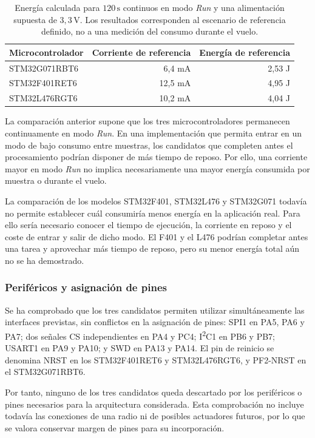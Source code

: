 \documentclass[11pt,a4paper]{article}
\begin{document}
\begin{table}[H]
    \centering
    \begin{tabular}{lrr}
        \toprule
        Microcontrolador & Corriente de referencia & Energía de referencia \\
        \midrule
        STM32G071RBT6 & 6,4 mA  & 2,53 J \\
        STM32F401RET6 & 12,5 mA & 4,95 J \\
        STM32L476RGT6 & 10,2 mA & 4,04 J \\
        \bottomrule
    \end{tabular}
    \caption{Energía calculada para \(120\,\mathrm{s}\) continuos en
    modo \textit{Run} y una alimentación supuesta de \(3{,}3\,\mathrm{V}\).
    Los resultados corresponden al escenario de referencia definido,
    no a una medición del consumo durante el vuelo.}%
    \label{tab:energia_referencia_uc}
\end{table}

La comparación anterior supone que los tres microcontroladores
permanecen continuamente en modo \textit{Run}. En una implementación
que permita entrar en un modo de bajo consumo entre muestras, los
candidatos que completen antes el procesamiento podrían disponer
de más tiempo de reposo. Por ello, una corriente mayor en modo
\textit{Run} no implica necesariamente una mayor energía consumida
por muestra o durante el vuelo.

La comparación de los modelos STM32F401, STM32L476 y STM32G071 todavía
no permite establecer cuál
consumiría menos energía en la aplicación real. Para ello sería necesario
conocer el tiempo de ejecución, la corriente en reposo y el coste de entrar
y salir de dicho modo. El F401 y el L476 podrían completar antes una tarea
y aprovechar más tiempo de reposo, pero su menor energía total aún no se ha
demostrado.
\subsubsection{Periféricos y asignación de pines}

Se ha comprobado que los tres candidatos permiten utilizar
simultáneamente las interfaces previstas, sin conflictos en la
asignación de pines: SPI1 en PA5, PA6 y PA7; dos señales CS
independientes en PA4 y PC4; I\textsuperscript{2}C1 en PB6 y PB7;
USART1 en PA9 y PA10; y SWD en PA13 y PA14. El pin de reinicio
se denomina NRST en los STM32F401RET6 y STM32L476RGT6, y
PF2-NRST en el STM32G071RBT6.

Por tanto, ninguno de los tres candidatos queda descartado por
los periféricos o pines necesarios para la arquitectura considerada.
Esta comprobación no incluye todavía las conexiones de una radio
ni de posibles actuadores futuros, por lo que se valora conservar
margen de pines para su incorporación.
\end{document}
